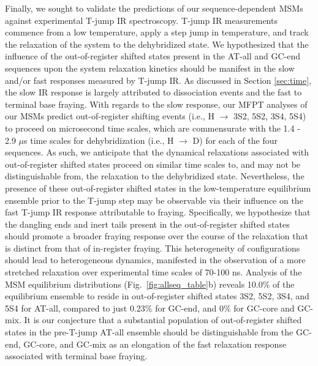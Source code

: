 \documentclass[journal=jpcbfk,manuscript=article]{achemso}
\newcommand*{\rood}[1]{{#1}}
\begin{document}
Finally, we sought to validate the predictions of our sequence-dependent MSMs against experimental T-jump IR spectroscopy. T-jump IR measurements commence from a low temperature, apply a step jump in temperature, and track the relaxation of the system to the dehybridized state. We hypothesized that the influence of the out-of-register shifted states present in the AT-all and GC-end sequences upon the system relaxation kinetics should be manifest in the slow and/or fast responses measured by T-jump IR. As discussed in Section \ref{sec:time}, the slow IR response is largely attributed to dissociation events and the fast to terminal base fraying. With regards to the slow response, our MFPT analyses of our MSMs predict out-of-register shifting events (i.e., H $\rightarrow$ 3S2, 5S2, 3S4, 5S4) to proceed on microsecond time scales, which are commensurate with the 1.4 - 2.9 $\mu$s time scales for dehybridization (i.e., H $\rightarrow$ D) for each of the four sequences. As such, we anticipate that the dynamical relaxations associated with out-of-register shifted states proceed on similar time scales to, and may not be distinguishable from, the relaxation to the dehybridized state. Nevertheless, the presence of these out-of-register shifted states in the low-temperature equilibrium ensemble prior to the T-jump step may be observable via their influence on the fast T-jump IR response attributable to fraying. Specifically, we hypothesize that the dangling ends and inert tails present in the out-of-register shifted states should promote a \rood{broader fraying response over the course of the relaxation that is distinct from that of in-register fraying. This heterogeneity of configurations should lead to heterogeneous dynamics, manifested in the observation of a more stretched relaxation over experimental time scales of 70-100 ns.} Analysis of the MSM equilibrium distributions (Fig.~\ref{fig:allseq_table}b) reveals 10.0\% of the equilibrium ensemble to reside in out-of-register shifted states 3S2, 5S2, 3S4, and 5S4 for AT-all, compared to just 0.23\% for GC-end, and 0\% for GC-core and GC-mix. It is our conjecture that a substantial population of out-of-register shifted states in the pre-T-jump AT-all ensemble should be distinguishable from the GC-end, GC-core, and GC-mix as an elongation of the fast relaxation response associated with terminal base fraying.
\end{document}
